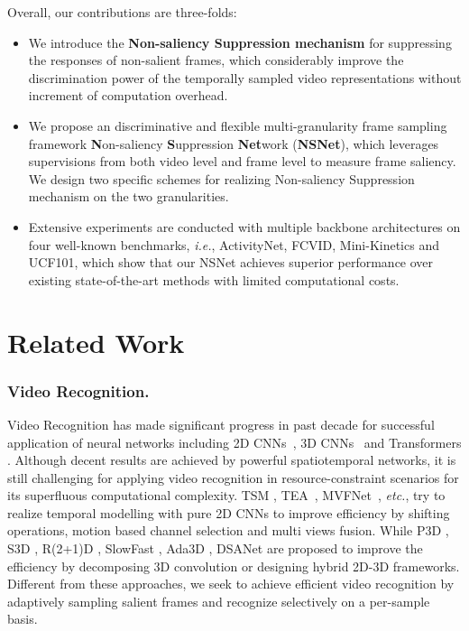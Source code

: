 \documentclass[runningheads]{llncs}
\def\ie{\emph{i.e.}}
\begin{document}
Overall, our contributions are three-folds:
\begin{itemize}
    \item We introduce the \textbf{Non-saliency Suppression mechanism} for suppressing the responses of non-salient frames, which considerably improve the discrimination power of the temporally sampled video representations without increment of computation overhead.
    \item We propose an discriminative and flexible multi-granularity frame sampling framework \textbf{N}on-saliency \textbf{S}uppression \textbf{Net}work (\textbf{NSNet}), which leverages supervisions from both video level and frame level to measure frame saliency. We design two specific schemes for realizing Non-saliency Suppression mechanism on the two granularities. 
\item Extensive experiments are conducted with multiple backbone architectures on four well-known benchmarks, \ie, ActivityNet, FCVID, Mini-Kinetics and UCF101, which show that our NSNet achieves superior performance over existing state-of-the-art methods with limited computational costs. 
\end{itemize}

\section{Related Work}
\label{relatedwork}
\subsubsection{Video Recognition.} Video Recognition has made significant progress in past decade for successful application of neural networks including 2D CNNs~\cite{tsn}, 3D CNNs~\cite{i3d} and Transformers \cite{timesformer,Wu2022TransferringTK}. 
Although decent results are achieved by powerful spatiotemporal networks,
it is still challenging for applying video recognition in resource-constraint scenarios for its superfluous computational complexity. TSM \cite{tsm}, TEA~\cite{tea2020}, MVFNet~\cite{mvf}, \emph{etc.}, try to realize temporal modelling with pure 2D CNNs to improve efficiency by shifting operations, motion based channel selection and multi views fusion. While P3D \cite{p3d}, S3D \cite{s3d}, R(2+1)D \cite{r2plus1d}, SlowFast \cite{slowfast}, Ada3D \cite{ada3d}, DSANet \cite{dsanet} are proposed to improve the efficiency by decomposing 3D convolution or designing hybrid 2D-3D frameworks. Different from these approaches, we seek to achieve efficient video recognition by adaptively sampling salient frames and recognize selectively on a per-sample basis.
\end{document}
